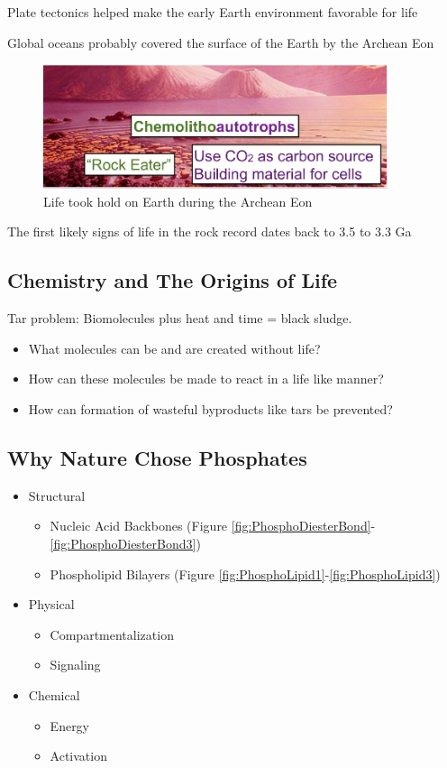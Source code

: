 \documentclass[]{article}
\begin{document}
Plate tectonics helped make the early Earth environment favorable for life

Global oceans probably covered the surface of the Earth by the Archean Eon



\begin{figure}[h!]
	\caption{Life took hold on Earth during the Archean Eon} 
	\includegraphics[width=0.9\textwidth]{Chemolithoautotrophs}
\end{figure}

The first likely signs of life in the rock record dates back to 3.5 to 3.3 Ga

\subsection{Chemistry and The Origins of Life}

Tar problem: Biomolecules plus heat and time = black sludge.

\begin{itemize}
	\item What molecules can be and are created without life?
	\item How can these molecules be made to react in a life like manner?
	\item How can formation of wasteful byproducts like	tars be prevented?
\end{itemize}
\subsection{Why Nature Chose Phosphates}

\begin{itemize}
	\item Structural
	\begin{itemize}
		\item Nucleic Acid Backbones (Figure \ref{fig:PhosphoDiesterBond}-\ref{fig:PhosphoDiesterBond3})
		\item Phospholipid Bilayers (Figure \ref{fig:PhosphoLipid1}-\ref{fig:PhosphoLipid3})
	\end{itemize}

	\item Physical\begin{itemize}
		\item Compartmentalization
		\item Signaling
	\end{itemize}
	\item Chemical
	\begin{itemize}
		\item Energy
		\item Activation
	\end{itemize}
\end{itemize}
\end{document}
